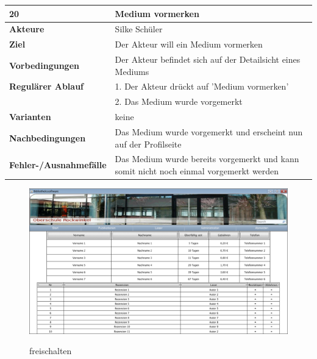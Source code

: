 \documentclass[fontsize=12pt,paper=a4,twoside]{scrartcl}
\begin{document}
\begin{table}[htbp]
\label{20}
\begin{tabular}{|l|p{10cm}|}
\hline 
\textbf{20} & \textbf{Medium vormerken} \\ \hline
\textbf{Akteure} & Silke Schüler\\ \hline
\textbf{Ziel} & Der Akteur will ein Medium vormerken \\ \hline
\textbf{Vorbedingungen} & Der Akteur befindet sich auf der Detailsicht eines Mediums \\ \hline
\textbf{Regulärer Ablauf} & 
1. Der Akteur drückt auf 'Medium vormerken' \\
&2. Das Medium wurde vorgemerkt\\
\hline
\textbf{Varianten} & 
keine \\ \hline
\textbf{Nachbedingungen} & Das Medium wurde vorgemerkt und erscheint nun auf der Profilseite\\ \hline
\textbf{Fehler-/Ausnahmefälle} & Das Medium wurde bereits vorgemerkt und kann somit nicht noch einmal 
vorgemerkt werden\\
\hline
\end{tabular}
\end{table}

\begin{figure}[htbp]
\caption{freischalten}
\includegraphics[width=1\textwidth]{ScreensWebsite/zuBearbeitendeNachrichtenBibliothekar.png}
  \label{freischalten}
\end{figure}
\end{document}
